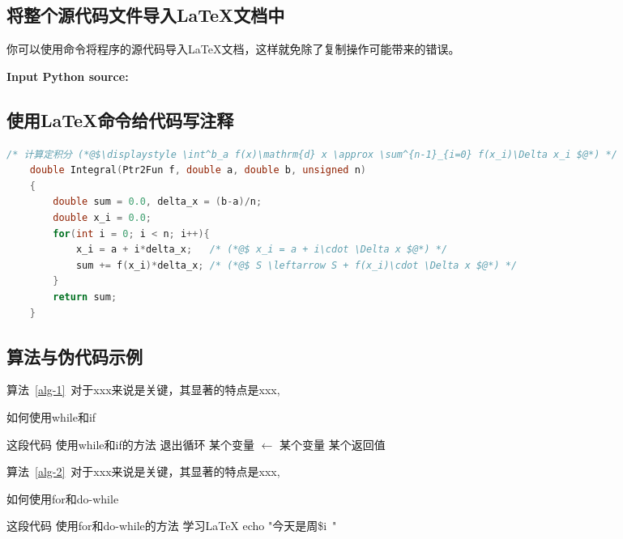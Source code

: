 \subsection{将整个源代码文件导入\LaTeX{}文档中}
你可以使用\verb*||命令将程序的源代码导入\LaTeX 文档，这样就免除了复制操作可能带来的错误。

\textbf{\textcolor[rgb]{0.98,0,0}{Input Python source:}}


\subsection{使用{\LaTeX{}}命令给代码写注释}

\begin{lstlisting}[language=C,frame=shadowbox,title={Integral-2.c}]
    /* 计算定积分 (*@$\displaystyle \int^b_a f(x)\mathrm{d} x \approx \sum^{n-1}_{i=0} f(x_i)\Delta x_i $@*) */
	double Integral(Ptr2Fun f, double a, double b, unsigned n)
	{
		double sum = 0.0, delta_x = (b-a)/n; 
		double x_i = 0.0;
		for(int i = 0; i < n; i++){
			x_i = a + i*delta_x;   /* (*@$ x_i = a + i\cdot \Delta x $@*) */
			sum += f(x_i)*delta_x; /* (*@$ S \leftarrow S + f(x_i)\cdot \Delta x $@*) */
		}
		return sum; 				
	}
\end{lstlisting}


\subsection{算法与伪代码示例}

算法~\ref{alg-1}~对于xxx来说是关键，其显著的特点是xxx, 

\begin{algorithm}[h]
	\caption{如何使用while和if} \label{alg-1}
	\begin{algorithmic}[1]  %
		\Require 这段代码
		\Ensure 使用while和if的方法
		\State 退出循环
		\EndIf
		\State 某个变量  $\gets$ 某个变量
		\EndWhile
		\State\Return 某个返回值
		\EndFunction
	\end{algorithmic}
\end{algorithm}

算法~\ref{alg-2}~对于xxx来说是关键，其显著的特点是xxx, 

\begin{breakablealgorithm}
	\caption{如何使用for和do-while} \label{alg-2}
	\begin{algorithmic}[1]  %
		\Require 这段代码
		\Ensure 使用for和do-while的方法
		\Repeat
		\State 学习\LaTeX
		\State echo "今天是周\$i\ "
		\EndFor
		\EndFunction
	\end{algorithmic}
\end{breakablealgorithm}


